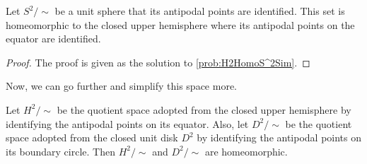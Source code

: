 \begin{proposition}
	\label{prop:UnitSphereHomoToUpperHemisphere}
	Let $ S^2/\sim $ be a unit sphere that its antipodal points are identified. This set is homeomorphic to the closed upper hemisphere where its antipodal points on the equator are identified.
\end{proposition}
\begin{proof}
	The proof is given as the solution to \autoref{prob:H2HomoS^2Sim}.
\end{proof}

Now, we can go further and simplify this space more.

\begin{proposition}
	\label{prop:H^2HomoToD^2Sim}
	Let $ H^2/\sim $ be the quotient space adopted from the closed upper hemisphere by identifying the antipodal points on its equator. Also, let $ D^2/\sim $ be the quotient space adopted from the closed unit disk $ D^2 $ by identifying the antipodal points on its boundary circle. Then $ H^2/\sim $ and $ D^2/\sim $ are homeomorphic.
\end{proposition}

